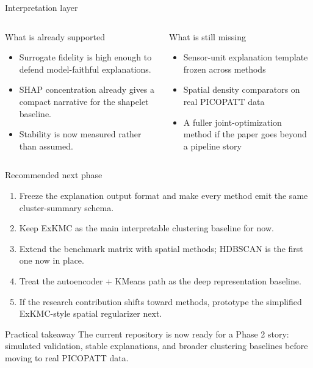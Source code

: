 \documentclass[aspectratio=169]{beamer}
\begin{document}
\begin{frame}{Interpretation layer}
  \begin{columns}[T,onlytextwidth]
    \begin{block}{What is already supported}
      \begin{itemize}
        \item Surrogate fidelity is high enough to defend model-faithful explanations.
        \item SHAP concentration already gives a compact narrative for the shapelet baseline.
        \item Stability is now measured rather than assumed.
      \end{itemize}
    \end{block}

    \begin{block}{What is still missing}
      \begin{itemize}
        \item Sensor-unit explanation template frozen across methods
        \item Spatial density comparators on real PICOPATT data
        \item A fuller joint-optimization method if the paper goes beyond a pipeline story
      \end{itemize}
    \end{block}
  \end{columns}
\end{frame}

\begin{frame}{Recommended next phase}
  \begin{enumerate}
    \item Freeze the explanation output format and make every method emit the same cluster-summary schema.
    \item Keep ExKMC as the main interpretable clustering baseline for now.
    \item Extend the benchmark matrix with spatial methods; HDBSCAN is the first one now in place.
    \item Treat the autoencoder + KMeans path as the deep representation baseline.
    \item If the research contribution shifts toward methods, prototype the simplified ExKMC-style spatial regularizer next.
  \end{enumerate}

  \vspace{0.5em}
  \begin{block}{Practical takeaway}
    The current repository is now ready for a Phase 2 story: simulated validation, stable explanations, and broader clustering baselines before moving to real PICOPATT data.
  \end{block}
\end{frame}
\end{document}
